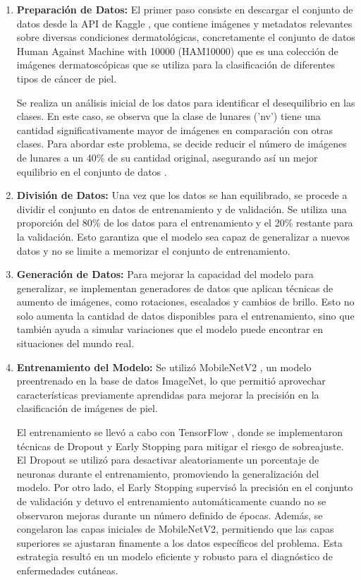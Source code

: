 \documentclass{article}
\begin{document}
\begin{enumerate}
	\item \textbf{Preparación de Datos:} El primer paso consiste en descargar el conjunto de datos desde la API de Kaggle \cite{kaggle_api}, que contiene imágenes y metadatos relevantes sobre diversas condiciones dermatológicas, concretamente el conjunto de datos Human Against Machine with 10000 (HAM10000) \cite{taha2018ham10000} que es una colección de imágenes dermatoscópicas que se utiliza para la clasificación de diferentes tipos de cáncer de piel. 
	
	Se realiza un análisis inicial de los datos para identificar el desequilibrio en las clases. En este caso, se observa que la clase de lunares ('nv') tiene una cantidad significativamente mayor de imágenes en comparación con otras clases. Para abordar este problema, se decide reducir el número de imágenes de lunares a un 40\% de su cantidad original, asegurando así un mejor equilibrio en el conjunto de datos .
	
	\item \textbf{División de Datos:} Una vez que los datos se han equilibrado, se procede a dividir el conjunto en datos de entrenamiento y de validación. Se utiliza una proporción del 80\% de los datos para el entrenamiento y el 20\% restante para la validación. Esto garantiza que el modelo sea capaz de generalizar a nuevos datos y no se limite a memorizar el conjunto de entrenamiento.
	
	\item \textbf{Generación de Datos:} Para mejorar la capacidad del modelo para generalizar, se implementan generadores de datos que aplican técnicas de aumento de imágenes, como rotaciones, escalados y cambios de brillo. Esto no solo aumenta la cantidad de datos disponibles para el entrenamiento, sino que también ayuda a simular variaciones que el modelo puede encontrar en situaciones del mundo real.
	
	\item \textbf{Entrenamiento del Modelo:} Se utilizó MobileNetV2 \cite{mobilenetv2}, un modelo preentrenado en la base de datos ImageNet, lo que permitió aprovechar características previamente aprendidas para mejorar la precisión en la clasificación de imágenes de piel. 
	
	El entrenamiento se llevó a cabo con TensorFlow \cite{abadi2016tensorflow}, donde se implementaron técnicas de Dropout y Early Stopping para mitigar el riesgo de sobreajuste. El Dropout se utilizó para desactivar aleatoriamente un porcentaje de neuronas durante el entrenamiento, promoviendo la generalización del modelo. Por otro lado, el Early Stopping supervisó la precisión en el conjunto de validación y detuvo el entrenamiento automáticamente cuando no se observaron mejoras durante un número definido de épocas. Además, se congelaron las capas iniciales de MobileNetV2, permitiendo que las capas superiores se ajustaran finamente a los datos específicos del problema. Esta estrategia resultó en un modelo eficiente y robusto para el diagnóstico de enfermedades cutáneas.
	

\end{enumerate}
\end{document}
